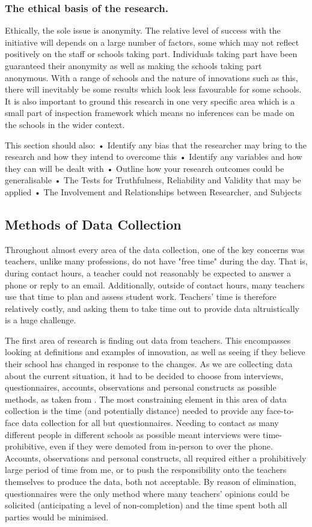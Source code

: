 \subsubsection{The ethical basis of the research.}
Ethically, the sole issue is anonymity. The relative level of success with the initiative will depends on a large number of factors, some which may not reflect positively on the staff or schools taking part. Individuals taking part have been guaranteed their anonymity as well as making the schools taking part anonymous. With a range of schools and the nature of innovations such as this, there will inevitably be some results which look less favourable for some schools. It is also important to ground this research in one very specific area which is a small part of inspection framework which means no inferences can be made on the schools in the wider context.

This section should also:
•	Identify any bias that the researcher may bring to the research and how they intend to overcome this
•	Identify any variables and how they can will be dealt with
•	Outline how your research outcomes could be generalisable
•	The Tests for Truthfulness, Reliability and Validity that may be applied
•	The Involvement and Relationships between Researcher, and Subjects

\subsection{Methods of Data Collection}
Throughout almost every area of the data collection, one of the key concerns was teachers, unlike many professions, do not have "free time" during the day. That is, during contact hours, a teacher could not reasonably be expected to answer a phone or reply to an email. Additionally, outside of contact hours, many teachers use that time to plan and assess student work. Teachers' time is therefore relatively costly, and asking them to take time out to provide data altruistically is a huge challenge.

The first area of research is finding out data from teachers. This encompasses looking at definitions and examples of innovation, as well as seeing if they believe their school has changed in response to the changes. As we are collecting data about the current situation, it had to be decided to choose from interviews, questionnaires, accounts, observations and personal constructs as possible methods, as taken from \citet{Cohen2005}.
The most constraining element in this area of data collection is the time (and potentially distance) needed to provide any face-to-face data collection for all but questionnaires. Needing to contact as many different people in different schools as possible meant interviews were time-prohibitive, even if they were demoted from in-person to over the phone. Accounts, observations and personal constructs, all required either a prohibitively large period of time from me, or to push the responsibility onto the teachers themselves to produce the data, both not acceptable. By reason of elimination, questionnaires were the only method where many teachers' opinions could be solicited (anticipating a level of non-completion) and the time spent both all parties would be minimised.

